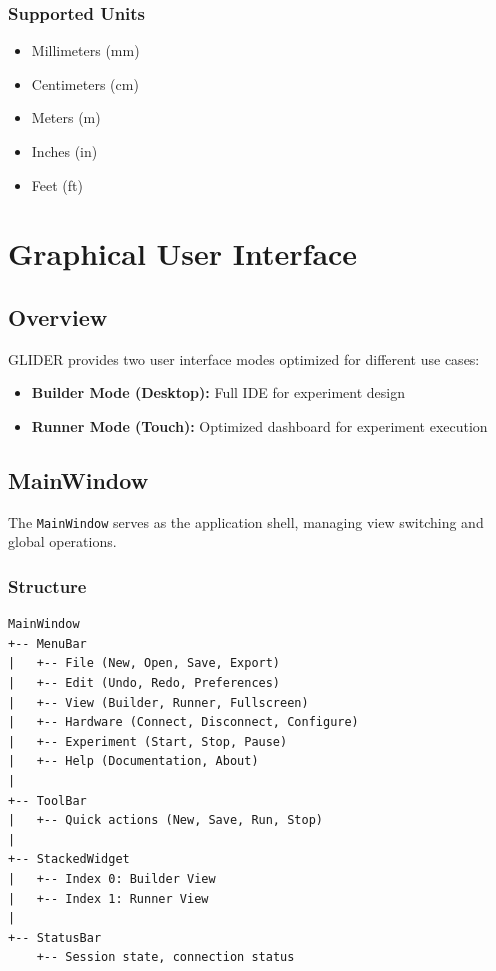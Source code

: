 \documentclass[11pt,a4paper]{article}
\begin{document}
\subsubsection{Supported Units}

\begin{itemize}    \item Millimeters (mm)
    \item Centimeters (cm)
    \item Meters (m)
    \item Inches (in)
    \item Feet (ft)
\end{itemize}

\section{Graphical User Interface}

\subsection{Overview}

GLIDER provides two user interface modes optimized for different use cases:

\begin{itemize}    \item \textbf{Builder Mode (Desktop):} Full IDE for experiment design
    \item \textbf{Runner Mode (Touch):} Optimized dashboard for experiment execution
\end{itemize}

\subsection{MainWindow}

The \texttt{MainWindow} serves as the application shell, managing view switching and global operations.

\subsubsection{Structure}

\begin{verbatim}
MainWindow
+-- MenuBar
|   +-- File (New, Open, Save, Export)
|   +-- Edit (Undo, Redo, Preferences)
|   +-- View (Builder, Runner, Fullscreen)
|   +-- Hardware (Connect, Disconnect, Configure)
|   +-- Experiment (Start, Stop, Pause)
|   +-- Help (Documentation, About)
|
+-- ToolBar
|   +-- Quick actions (New, Save, Run, Stop)
|
+-- StackedWidget
|   +-- Index 0: Builder View
|   +-- Index 1: Runner View
|
+-- StatusBar
    +-- Session state, connection status
\end{verbatim}
\end{document}
